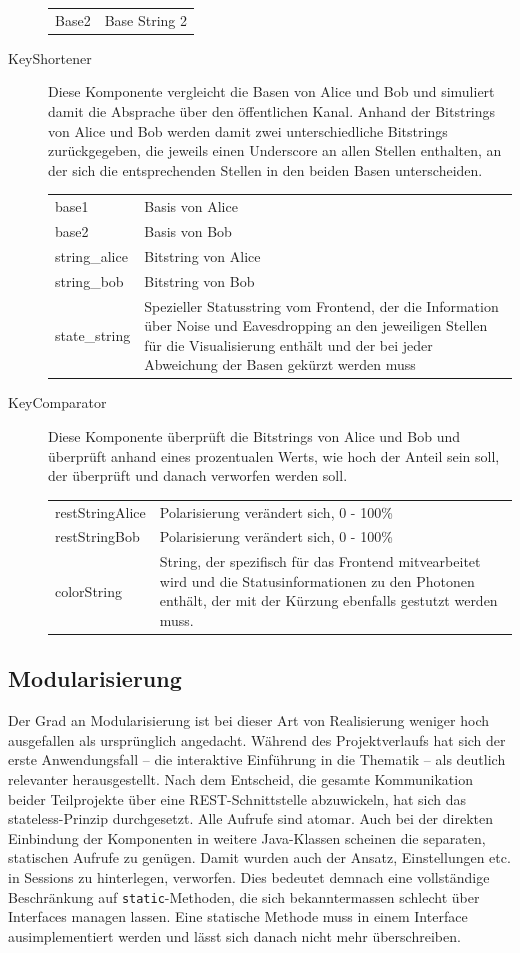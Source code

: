\documentclass[a4paper,10.2pt,pdftex]{scrartcl}%
\begin{document}
\begin{description}
\begin{tabular}{p{3cm}p{9cm}}
Base2 & Base String 2  
\end{tabular}
\item[KeyShortener] 
Diese Komponente vergleicht die Basen von Alice und Bob und simuliert damit die Absprache über den öffentlichen Kanal. Anhand der Bitstrings von Alice und Bob werden damit zwei unterschiedliche Bitstrings zurückgegeben, die jeweils einen Underscore an allen Stellen enthalten, an der sich die entsprechenden Stellen in den beiden Basen unterscheiden. 
\\
\begin{tabular}{p{3cm}p{7.5cm}}
base1  & Basis von Alice \\
base2  & Basis von Bob \\
string\_alice &  Bitstring von Alice \\
string\_bob & Bitstring von Bob \\ 
state\_string & Spezieller Statusstring vom Frontend, der die Information über Noise und Eavesdropping an den jeweiligen Stellen für die Visualisierung enthält und der bei jeder Abweichung der Basen gekürzt werden muss \\
\end{tabular} 
\item[KeyComparator] 
Diese Komponente überprüft die Bitstrings von Alice und Bob und überprüft anhand eines prozentualen Werts, wie hoch der Anteil sein soll, der überprüft und danach verworfen werden soll. \\
\begin{tabular}{p{3cm}p{7.5cm}}
restStringAlice  & Polarisierung verändert sich, 0 - 100\% \\
restStringBob & Polarisierung verändert sich, 0 - 100\% \\
colorString & String, der spezifisch für das Frontend mitvearbeitet wird und die Statusinformationen zu den Photonen enthält, der mit der Kürzung ebenfalls gestutzt werden muss. 
\end{tabular} 
\end{description}
\subsection{Modularisierung}
Der Grad an Modularisierung ist bei dieser Art von Realisierung weniger hoch ausgefallen als ursprünglich angedacht. Während des Projektverlaufs hat sich der erste Anwendungsfall -- die interaktive Einführung in die Thematik -- als deutlich relevanter herausgestellt. Nach dem Entscheid, die gesamte Kommunikation beider Teilprojekte über eine REST-Schnittstelle abzuwickeln, hat sich das stateless-Prinzip durchgesetzt. Alle Aufrufe sind atomar. Auch bei der direkten Einbindung der Komponenten in weitere Java-Klassen scheinen die separaten, statischen Aufrufe zu genügen. Damit wurden auch der Ansatz, Einstellungen etc. in Sessions zu hinterlegen, verworfen. Dies bedeutet demnach eine vollständige Beschränkung auf \texttt{static}-Methoden, die sich bekanntermassen schlecht über Interfaces managen lassen. Eine statische Methode  muss in einem Interface ausimplementiert werden und lässt sich danach nicht mehr überschreiben. 
\end{document}
